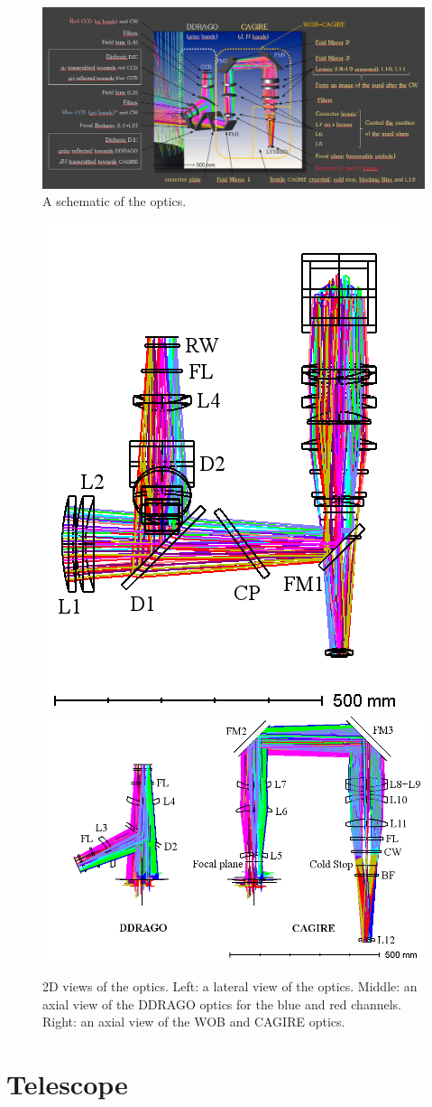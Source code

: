 \documentclass{report}
\begin{document}
\begin{figure}
\centering
\includegraphics[width=1.0\linewidth]{figures/optics.png}
\caption{A schematic of the optics.}
\label{figure:optics-schematic}
\end{figure}

\begin{figure}
\centering
\includegraphics[width=0.3\linewidth]{figures/LAYOUT_lateral.png}%
\includegraphics[width=0.7\linewidth]{figures/LAYOUT_front.png}
\caption{2D views of the optics. Left: a lateral view of the optics. Middle: an axial view of the DDRAGO optics for the blue and red channels. Right: an axial view of the WOB and CAGIRE optics.}
\label{figure:optics-layout-2d}
\end{figure}


\clearpage
\chapter{Telescope}
\end{document}
